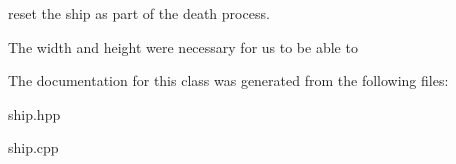 reset the ship as part of the death process. 

The width and height were necessary for us to be able to 

The documentation for this class was generated from the following files\+:\begin{DoxyCompactItemize}
\item 
ship.\+hpp\item 
ship.\+cpp\end{DoxyCompactItemize}
